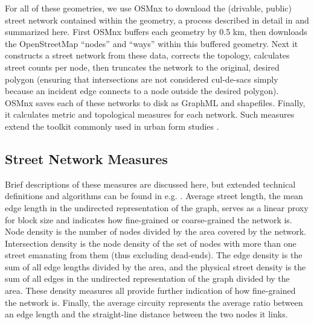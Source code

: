 \documentclass{article}
\begin{document}
For all of these geometries, we use OSMnx to download the (drivable, public) street network contained within the geometry, a process described in detail in \cite{boeing_osmnx:_2017} and summarized here. First OSMnx buffers each geometry by 0.5 km, then downloads the OpenStreetMap \enquote{nodes} and \enquote{ways} within this buffered geometry. Next it constructs a street network from these data, corrects the topology, calculates street counts per node, then truncates the network to the original, desired polygon (ensuring that intersections are not considered cul-de-sacs simply because an incident edge connects to a node outside the desired polygon). OSMnx saves each of these networks to disk as GraphML and shapefiles. Finally, it calculates metric and topological measures for each network. Such measures extend the toolkit commonly used in urban form studies \cite{talen_measuring_2003, ewing_travel_2010}.

\subsection{Street Network Measures}

Brief descriptions of these measures are discussed here, but extended technical definitions and algorithms can be found in e.g. \cite{trudeau_introduction_1994, albert_statistical_2002, dorogovtsev_evolution_2002, brandes_network_2005, costa_characterization_2007, newman_structure_2003, newman_networks:_2010, barthelemy_spatial_2011, cranmer_navigating_2017}. Average street length, the mean edge length in the undirected representation of the graph, serves as a linear proxy for block size and indicates how fine-grained or coarse-grained the network is. Node density is the number of nodes divided by the area covered by the network. Intersection density is the node density of the set of nodes with more than one street emanating from them (thus excluding dead-ends). The edge density is the sum of all edge lengths divided by the area, and the physical street density is the sum of all edges in the undirected representation of the graph divided by the area. These density measures all provide further indication of how fine-grained the network is. Finally, the average circuity represents the average ratio between an edge length and the straight-line distance between the two nodes it links.
\end{document}
